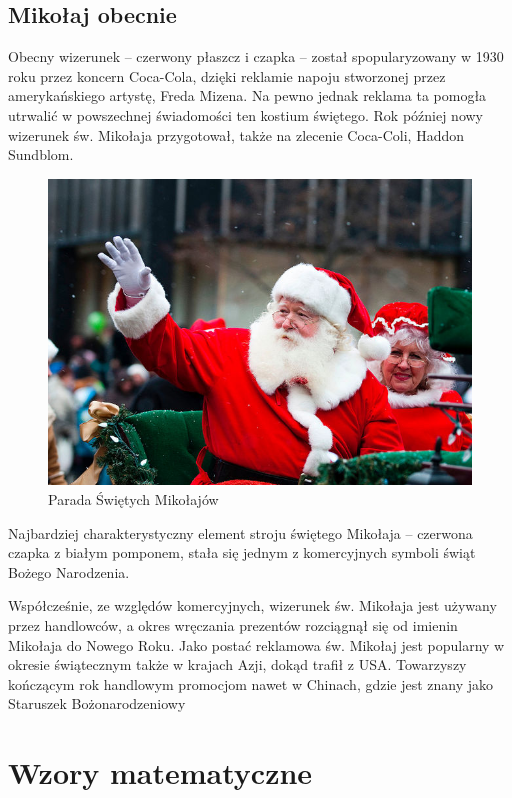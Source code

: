 \documentclass[oneside, fleqn]{book}
\begin{document}
\section{Mikołaj obecnie}
Obecny wizerunek – czerwony płaszcz i czapka – został spopularyzowany w 1930 roku przez koncern Coca-Cola, dzięki reklamie napoju stworzonej przez amerykańskiego artystę, Freda Mizena. Na pewno jednak reklama ta pomogła utrwalić w powszechnej świadomości ten kostium świętego. Rok później nowy wizerunek św. Mikołaja przygotował, także na zlecenie Coca-Coli, Haddon Sundblom.
\begin{figure}[htbp]

\includegraphics[width=\textwidth]{3.jpg}
\caption{Parada Świętych Mikołajów}\label{rys:mik:3}

\end{figure}

Najbardziej charakterystyczny element stroju świętego Mikołaja – czerwona czapka z białym pomponem, stała się jednym z komercyjnych symboli świąt Bożego Narodzenia.

Współcześnie, ze względów komercyjnych, wizerunek św. Mikołaja jest używany przez handlowców, a okres wręczania prezentów rozciągnął się od imienin Mikołaja do Nowego Roku. Jako postać reklamowa św. Mikołaj jest popularny w okresie świątecznym także w krajach Azji, dokąd trafił z USA. Towarzyszy kończącym rok handlowym promocjom nawet w Chinach, gdzie jest znany jako Staruszek Bożonarodzeniowy
\chapter{Wzory matematyczne}
\end{document}
